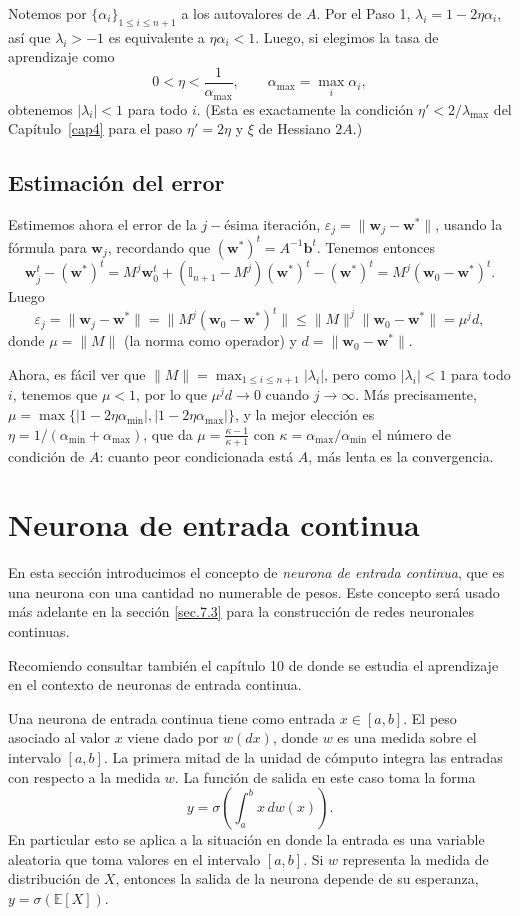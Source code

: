 \documentclass[12pt, a4paper]{amsbook}
\newcommand{\ve}{\varepsilon}
\newcommand{\E}{{\mathbb E}}
\newcommand{\II}{{\mathbb I}}
\newcommand{\ww}{{\mathbf w}}
\newcommand{\bb}{{\mathbf b}}
\theoremstyle{remark}
\theoremstyle{definition}
\numberwithin{section}{chapter}
\numberwithin{subsection}{section}
\numberwithin{equation}{section}
\numberwithin{figure}{chapter}
\begin{document}
Notemos por $\{\alpha_i\}_{1\le i\le n+1}$ a los autovalores de $A$. Por el Paso 1, $\lambda_i=1-2\eta\alpha_i$, así que $\lambda_i>-1$ es equivalente a $\eta\alpha_i<1$. Luego, si elegimos la tasa de aprendizaje como
$$
0<\eta<\frac{1}{\alpha_\text{max}},\qquad \alpha_\text{max}=\max_{i}\alpha_i,
$$
obtenemos $|\lambda_i|<1$ para todo $i$. (Esta es exactamente la condición $\eta'<2/\lambda_\text{max}$ del Capítulo~\ref{cap4} para el paso $\eta'=2\eta$ y $\xi$ de Hessiano $2A$.)

\subsection*{Estimación del error} Estimemos ahora el error de la $j-$ésima iteración, $\ve_j = \|\ww_j-\ww^*\|$, usando la fórmula para $\ww_j$, recordando que $(\ww^*)^t=A^{-1}\bb^t$. Tenemos entonces
$$
\ww_j^t - (\ww^*)^t = M^j \ww_0^t + (\II_{n+1} - M^j)(\ww^*)^t - (\ww^*)^t = M^j(\ww_0 - \ww^*)^t.
$$
Luego
$$
\ve_j = \|\ww_j-\ww^*\| = \|M^j(\ww_0 - \ww^*)^t\|\le \|M\|^j \|\ww_0-\ww^*\| = \mu^j d,
$$
donde $\mu=\|M\|$ (la norma como operador) y $d=\|\ww_0-\ww^*\|$.

Ahora, es fácil ver que $\|M\| = \max_{1\le i\le n+1} |\lambda_i|$, pero como $|\lambda_i|<1$ para todo $i$, tenemos que $\mu<1$, por lo que $\mu^j d \to 0$ cuando $j\to\infty$. Más precisamente, $\mu=\max\{|1-2\eta\alpha_\text{min}|,|1-2\eta\alpha_\text{max}|\}$, y la mejor elección es $\eta=1/(\alpha_\text{min}+\alpha_\text{max})$, que da $\mu=\frac{\kappa-1}{\kappa+1}$ con $\kappa=\alpha_\text{max}/\alpha_\text{min}$ el número de condición de $A$: cuanto peor condicionada está $A$, más lenta es la convergencia.

\section{Neurona de entrada continua}\label{sec.5.8}\label{sec.c5.6}

En esta sección introducimos el concepto de {\em neurona de entrada continua}, que es una neurona con una cantidad no numerable de pesos. Este concepto será usado más adelante en la sección \ref{sec.7.3} para la construcción de redes neuronales continuas. 

Recomiendo consultar también el capítulo 10 de \cite{Calin} donde se estudia el aprendizaje en el contexto de neuronas de entrada continua.

Una neurona de entrada continua tiene como entrada $x\in [a, b]$. El peso asociado al valor $x$ viene dado por $w(dx)$, donde $w$ es una medida sobre el intervalo $[a, b]$. La primera mitad de la unidad de cómputo integra las entradas con respecto a la medida $w$. La función de salida en este caso toma la forma
\begin{equation}\label{5.8.7}
y=\sigma\left(\int_a^b x\, dw(x)\right).
\end{equation}
En particular esto se aplica a la situación en donde la entrada es una variable aleatoria que toma valores en el intervalo $[a, b]$. Si $w$ representa la medida de distribución de $X$, entonces la salida de la neurona depende de su esperanza, $y=\sigma(\E[X])$.
\end{document}
